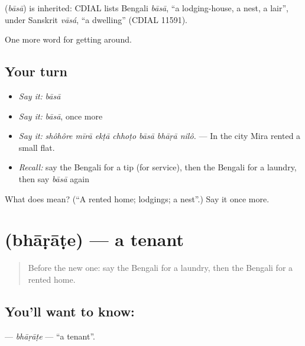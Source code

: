 \begin{cousinweb}
\textbf{} (\emph{bāsā}) is inherited: CDIAL lists Bengali \emph{bāsā}, \textquotedblleft{}a lodging-house, a nest, a lair\textquotedblright{}, under Sanskrit \emph{vāsá}, \textquotedblleft{}a dwelling\textquotedblright{} (CDIAL 11591).
\end{cousinweb}

\begin{grammarlens}[title={What you've built}]
One more word for getting around.
\end{grammarlens}

\subsection*{Your turn}
\begin{itemize}
\raggedright
  \item \emph{Say it:} \emph{bāsā}
  \item \emph{Say it:} \emph{bāsā}, once more
  \item \emph{Say it:} \emph{shôhôre mīrā ekṭā chhoṭo bāsā bhāṛā nilô.} — In the city Mira rented a small flat.
  \item \emph{Recall:} say the Bengali for a tip (for service), then the Bengali for a laundry, then say \emph{bāsā} again
\end{itemize}

\begin{tcolorbox}[breakable,colback=teal!4,colframe=teal!35!black,title={Before you move on}]
What does  mean? (\textquotedblleft{}A rented home; lodgings; a nest\textquotedblright{}.) Say it once more.
\end{tcolorbox}
\section[\texorpdfstring{\bn{ভাড়াটে} (bhāṛāṭe)}{ভাড়াটে (bhāṛāṭe)}]{ (bhāṛāṭe) — a tenant}

\label{lesson:BN-C408-bharate}



\begin{quote}
Before the new one: say the Bengali for a laundry, then the Bengali for a rented home.
\end{quote}

\subsection*{You'll want to know: }
\textbf{} — \emph{bhāṛāṭe} — \textquotedblleft{}a tenant\textquotedblright{}.

